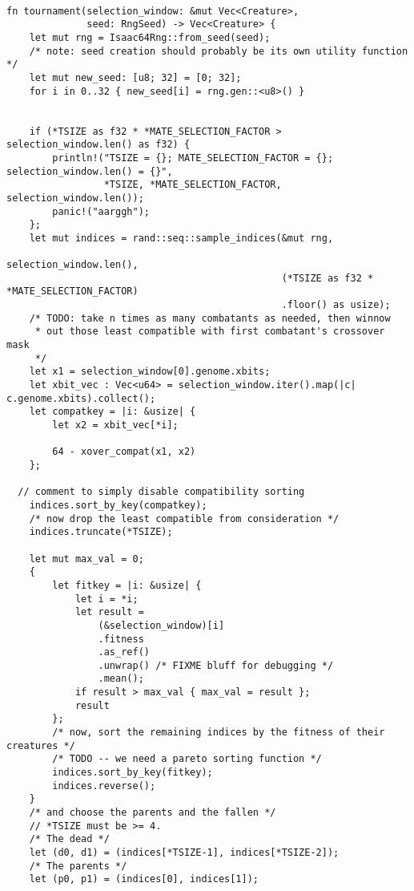 \documentclass[11pt]{article}
\begin{document}
\lstset{language=rust,label=orgcbd6881,caption= ,captionpos=b,numbers=none}
\begin{lstlisting}

fn tournament(selection_window: &mut Vec<Creature>,
              seed: RngSeed) -> Vec<Creature> {
    let mut rng = Isaac64Rng::from_seed(seed);
    /* note: seed creation should probably be its own utility function */
    let mut new_seed: [u8; 32] = [0; 32];
    for i in 0..32 { new_seed[i] = rng.gen::<u8>() }


    if (*TSIZE as f32 * *MATE_SELECTION_FACTOR > selection_window.len() as f32) {
        println!("TSIZE = {}; MATE_SELECTION_FACTOR = {}; selection_window.len() = {}",
                 *TSIZE, *MATE_SELECTION_FACTOR, selection_window.len());
        panic!("aarggh");
    };
    let mut indices = rand::seq::sample_indices(&mut rng,
                                                selection_window.len(),
                                                (*TSIZE as f32 * *MATE_SELECTION_FACTOR)
                                                .floor() as usize);
    /* TODO: take n times as many combatants as needed, then winnow
     * out those least compatible with first combatant's crossover mask
     */
    let x1 = selection_window[0].genome.xbits;
    let xbit_vec : Vec<u64> = selection_window.iter().map(|c| c.genome.xbits).collect();
    let compatkey = |i: &usize| {
        let x2 = xbit_vec[*i];

        64 - xover_compat(x1, x2)
    };

  // comment to simply disable compatibility sorting
    indices.sort_by_key(compatkey);
    /* now drop the least compatible from consideration */
    indices.truncate(*TSIZE);

    let mut max_val = 0;
    {
        let fitkey = |i: &usize| {
            let i = *i;
            let result = 
                (&selection_window)[i]
                .fitness
                .as_ref()
                .unwrap() /* FIXME bluff for debugging */
                .mean();
            if result > max_val { max_val = result };
            result
        };
        /* now, sort the remaining indices by the fitness of their creatures */
        /* TODO -- we need a pareto sorting function */
        indices.sort_by_key(fitkey);
        indices.reverse();
    }
    /* and choose the parents and the fallen */
    // *TSIZE must be >= 4.
    /* The dead */
    let (d0, d1) = (indices[*TSIZE-1], indices[*TSIZE-2]);
    /* The parents */
    let (p0, p1) = (indices[0], indices[1]);





\end{lstlisting}
\end{document}
